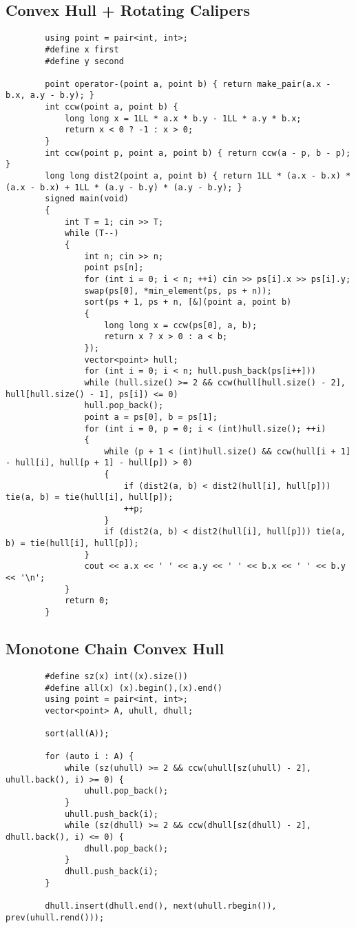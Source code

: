\documentclass[landscape, 8pt, a4paper, oneside, twocolumn]{extarticle}
\begin{document}
	\subsection{Convex Hull + Rotating Calipers}
	\begin{verbatim}
		using point = pair<int, int>;
		#define x first
		#define y second
		
		point operator-(point a, point b) { return make_pair(a.x - b.x, a.y - b.y); }
		int ccw(point a, point b) {
			long long x = 1LL * a.x * b.y - 1LL * a.y * b.x;
			return x < 0 ? -1 : x > 0;
		}
		int ccw(point p, point a, point b) { return ccw(a - p, b - p); }
		long long dist2(point a, point b) { return 1LL * (a.x - b.x) * (a.x - b.x) + 1LL * (a.y - b.y) * (a.y - b.y); }
		signed main(void)
		{
			int T = 1; cin >> T;
			while (T--)
			{
				int n; cin >> n;
				point ps[n];
				for (int i = 0; i < n; ++i) cin >> ps[i].x >> ps[i].y;
				swap(ps[0], *min_element(ps, ps + n));
				sort(ps + 1, ps + n, [&](point a, point b)
				{
					long long x = ccw(ps[0], a, b);
					return x ? x > 0 : a < b;
				});
				vector<point> hull;
				for (int i = 0; i < n; hull.push_back(ps[i++]))
				while (hull.size() >= 2 && ccw(hull[hull.size() - 2], hull[hull.size() - 1], ps[i]) <= 0)
				hull.pop_back();
				point a = ps[0], b = ps[1];
				for (int i = 0, p = 0; i < (int)hull.size(); ++i)
				{
					while (p + 1 < (int)hull.size() && ccw(hull[i + 1] - hull[i], hull[p + 1] - hull[p]) > 0)
					{
						if (dist2(a, b) < dist2(hull[i], hull[p])) tie(a, b) = tie(hull[i], hull[p]);
						++p;
					}
					if (dist2(a, b) < dist2(hull[i], hull[p])) tie(a, b) = tie(hull[i], hull[p]);
				}
				cout << a.x << ' ' << a.y << ' ' << b.x << ' ' << b.y << '\n';
			}
			return 0;
		}
	\end{verbatim}
	\subsection{Monotone Chain Convex Hull}
	\begin{verbatim}
		#define sz(x) int((x).size())
		#define all(x) (x).begin(),(x).end()
		using point = pair<int, int>;
		vector<point> A, uhull, dhull;
		
		sort(all(A));
		
		for (auto i : A) {
			while (sz(uhull) >= 2 && ccw(uhull[sz(uhull) - 2], uhull.back(), i) >= 0) {
				uhull.pop_back();
			}
			uhull.push_back(i);
			while (sz(dhull) >= 2 && ccw(dhull[sz(dhull) - 2], dhull.back(), i) <= 0) {
				dhull.pop_back();
			}
			dhull.push_back(i);
		}
		
		dhull.insert(dhull.end(), next(uhull.rbegin()), prev(uhull.rend()));
	\end{verbatim}
\end{document}
